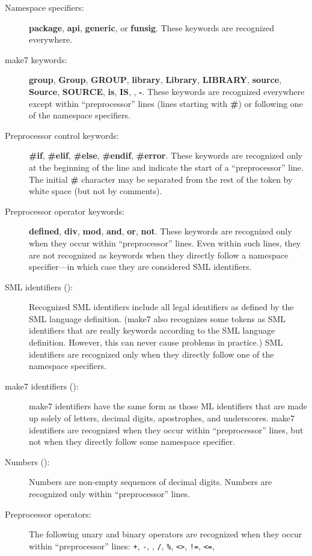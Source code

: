 \begin{description}
\item[Namespace specifiers:] {\bf package}, {\bf api},
{\bf generic}, or {\bf funsig}.  These keywords are recognized
everywhere.
\item[make7 keywords:] {\bf group}, {\bf Group}, {\bf GROUP}, {\bf
library}, {\bf Library}, {\bf LIBRARY}, {\bf source}, {\bf Source},
{\bf SOURCE}, {\bf is}, {\bf IS}, {\bf *}, {\bf -}.  These keywords
are recognized everywhere except within ``preprocessor'' lines (lines
starting with {\bf \#}) or following one of the namespace specifiers.
\item[Preprocessor control keywords:] {\bf \#if}, {\bf \#elif}, {\bf
\#else}, {\bf \#endif}, {\bf \#error}.  These keywords are recognized
only at the beginning of the line and indicate the start of a
``preprocessor'' line.  The initial {\bf \#} character may be
separated from the rest of the token by white space (but not by comments).
\item[Preprocessor operator keywords:] {\bf defined}, {\bf div}, {\bf
mod}, {\bf and}, {\bf or}, {\bf not}.  These keywords are
recognized only when they occur within ``preprocessor'' lines.  Even
within such lines, they are not recognized as keywords when they
directly follow a namespace specifier---in which case they are
considered SML identifiers.
\item[SML identifiers ():] Recognized SML identifiers
include all legal identifiers as defined by the SML language
definition. (make7 also recognizes some tokens as SML identifiers that
are really keywords according to the SML language definition. However,
this can never cause problems in practice.)  SML identifiers are
recognized only when they directly follow one of the namespace
specifiers.
\item[make7 identifiers ():] make7 identifiers have the same form
as those ML identifiers that are made up solely of letters, decimal
digits, apostrophes, and underscores.  make7 identifiers are recognized when they
occur within ``preprocessor'' lines, but not when they directly follow
some namespace specifier.
\item[Numbers ():] Numbers are non-empty sequences of
decimal digits.  Numbers are recognized only within ``preprocessor''
lines.
\item[Preprocessor operators:] The following unary and binary operators are
recognized when they occur within ``preprocessor'' lines: {\tt +},
{\tt -}, {\tt *}, {\tt /}, {\tt \%}, {\tt <>}, {\tt !=}, {\tt <=},

\end{description}

